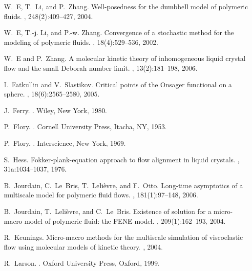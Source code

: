 \documentclass[reqno]{amsart}
\numberwithin{equation}{section}
\theoremstyle{definition}
\theoremstyle{remark}
\begin{document}
\begin{thebibliography}{99}
W.~E, T.~Li, and P.~Zhang.
\newblock Well-posedness for the dumbbell model of polymeric fluids.
, 248(2):409--427, 2004.

W.~E, T.-j. Li, and P.-w. Zhang.
\newblock Convergence of a stochastic method for the modeling of polymeric
  fluids.
, 18(4):529--536, 2002.

W.~E and P.~Zhang.
\newblock A molecular kinetic theory of inhomogeneous liquid crystal flow and
  the small {D}eborah number limit.
, 13(2):181--198, 2006.

I.~Fatkullin and V.~Slastikov.
\newblock Critical points of the {O}nsager functional on a sphere.
, 18(6):2565--2580, 2005.

J.~Ferry.
.
\newblock Wiley, New York, 1980.

P.~Flory.
.
\newblock Cornell University Press, Itacha, NY, 1953.

P.~Flory.
.
\newblock Interscience, New York, 1969.

S.~Hess.
\newblock Fokker-plank-equation approach to flow alignment in liquid crystals.
, 31a:1034--1037, 1976.

B.~Jourdain, C.~Le~Bris, T.~Leli{\`e}vre, and F.~Otto.
\newblock Long-time asymptotics of a multiscale model for polymeric fluid
  flows.
, 181(1):97--148, 2006.

B.~Jourdain, T.~Leli{\`e}vre, and C.~Le~Bris.
\newblock Existence of solution for a micro-macro model of polymeric fluid: the
  {FENE} model.
, 209(1):162--193, 2004.

R.~Keunings.
\newblock Micro-macro methods for the multiscale simulation of viscoelastic
  flow using molecular models of kinetic theory.
, 2004.

R.~Larson.
.
\newblock Oxford University Press, Oxford, 1999.


\end{thebibliography}
\end{document}
